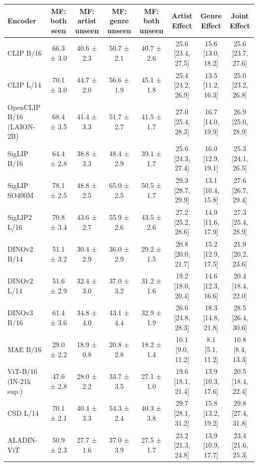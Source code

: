 \begin{tabular}{lccccccc}
\toprule
Encoder & MF: both seen & MF: artist unseen & MF: genre unseen & MF: both unseen & Artist Effect & Genre Effect & Joint Effect \\
\midrule
CLIP B/16 & 66.3 ± 3.0 & 40.6 ± 2.3 & 50.7 ± 2.1 & 40.7 ± 2.6 & 25.6 [23.4, 27.5] & 15.6 [13.0, 18.2] & 25.6 [23.7, 27.6] \\
CLIP L/14 & 70.1 ± 3.0 & 44.7 ± 2.0 & 56.6 ± 1.9 & 45.1 ± 1.8 & 25.4 [24.2, 26.9] & 13.5 [11.2, 16.3] & 25.0 [23.2, 26.8] \\
OpenCLIP B/16 (LAION-2B) & 68.4 ± 3.5 & 41.4 ± 3.3 & 51.7 ± 2.7 & 41.5 ± 1.7 & 27.0 [25.4, 28.3] & 16.7 [14.0, 19.9] & 26.9 [25.0, 28.9] \\
SigLIP B/16 & 64.4 ± 2.8 & 38.8 ± 3.3 & 48.4 ± 2.9 & 39.1 ± 1.7 & 25.6 [24.3, 27.4] & 16.0 [12.9, 19.1] & 25.3 [24.1, 26.5] \\
SigLIP SO400M & 78.1 ± 2.5 & 48.8 ± 2.5 & 65.0 ± 2.5 & 50.5 ± 1.7 & 29.3 [28.7, 29.9] & 13.1 [10.4, 15.8] & 27.6 [26.7, 29.4] \\
SigLIP2 L/16 & 70.8 ± 3.4 & 43.6 ± 2.7 & 55.9 ± 2.6 & 43.5 ± 2.6 & 27.2 [25.2, 28.6] & 14.9 [11.6, 17.9] & 27.3 [25.4, 28.9] \\
DINOv2 B/14 & 51.1 ± 3.2 & 30.4 ± 2.9 & 36.0 ± 2.9 & 29.2 ± 1.5 & 20.8 [20.0, 21.7] & 15.2 [12.9, 17.5] & 21.9 [20.2, 23.6] \\
DINOv2 L/14 & 51.6 ± 2.9 & 32.4 ± 3.0 & 37.0 ± 3.2 & 31.2 ± 1.6 & 19.2 [18.0, 20.4] & 14.6 [12.3, 16.6] & 20.4 [18.4, 22.0] \\
DINOv3 B/16 & 61.4 ± 3.6 & 34.8 ± 4.0 & 43.1 ± 4.4 & 32.9 ± 1.9 & 26.6 [24.8, 28.3] & 18.3 [14.8, 21.8] & 28.5 [26.4, 30.6] \\
MAE B/16 & 29.0 ± 2.2 & 18.9 ± 0.8 & 20.8 ± 2.8 & 18.2 ± 1.4 & 10.1 [9.0, 11.2] & 8.1 [5.1, 11.2] & 10.8 [8.4, 13.3] \\
ViT-B/16 (IN-21k sup.) & 47.6 ± 2.8 & 28.0 ± 2.2 & 33.7 ± 3.5 & 27.1 ± 1.0 & 19.6 [18.1, 21.4] & 13.9 [10.3, 17.6] & 20.5 [18.4, 22.4] \\
CSD L/14 & 70.1 ± 2.1 & 40.4 ± 3.3 & 54.3 ± 2.4 & 40.3 ± 3.8 & 29.7 [28.1, 31.2] & 15.8 [13.2, 19.2] & 29.8 [27.4, 31.8] \\
ALADIN-ViT & 50.9 ± 2.3 & 27.7 ± 1.6 & 37.0 ± 3.9 & 27.5 ± 1.7 & 23.2 [21.3, 24.8] & 13.9 [10.9, 17.7] & 23.4 [21.6, 25.3] \\
\bottomrule
\end{tabular}
